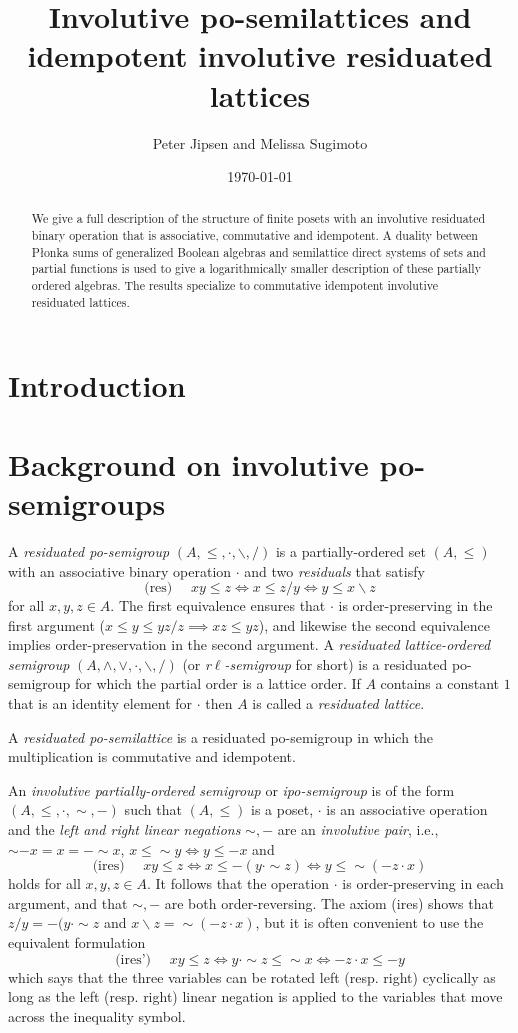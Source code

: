 \documentclass[12pt]{amsart}
\title{Involutive po-semilattices and idempotent involutive residuated lattices}
\author{Peter Jipsen and Melissa Sugimoto}
\date{\today}%
\newcommand{\rd}{{/}}
\newcommand{\ld}{{\backslash}}
\renewcommand{\ln}{{\sim}}
\newcommand{\rn}{{-}}
\begin{document}
\begin{abstract}
We give a full description of the structure of finite
posets with an involutive residuated binary operation that is associative, commutative and idempotent.
A duality between P\l onka sums of generalized Boolean algebras
and semilattice direct systems of sets and partial functions
is used to give a logarithmically smaller description of these partially
ordered algebras. The results specialize to commutative idempotent
involutive residuated lattices.
\end{abstract}

\maketitle

\section{Introduction}

\section{Background on involutive po-semigroups}
A \emph{residuated po-semigroup} $(A,\le,\cdot,\ld,\rd)$ is a partially-ordered set $(A,\le)$ with an associative binary operation $\cdot$ and two \emph{residuals} that satisfy
$$
\text{(res) }\quad xy\le z\iff x\le z\rd y\iff y\le x\ld z
$$
for all $x,y,z\in A$.
The first equivalence ensures that $\cdot$ is order-preserving in the first argument ($x\le y\le yz\rd z\implies xz\le yz$), and likewise the second equivalence implies order-preservation in the second argument. A \emph{residuated lattice-ordered semigroup} $(A,\wedge,\vee,\cdot,\ld,\rd)$ (or \emph{r$\ell$-semigroup} for short) is a residuated po-semigroup for which the partial order is
a lattice order. If $A$ contains a constant $1$ that is an identity element for $\cdot$ then $A$ is
called a \emph{residuated lattice}.

A \emph{residuated po-semilattice} is a residuated po-semigroup in which the multiplication is commutative and idempotent.

An \emph{involutive partially-ordered semigroup} or \emph{ipo-semigroup} is of the form $(A,\le,\cdot,\ln,\rn)$ such that $(A,\le)$ is a poset, $\cdot$ is an associative operation and the \emph{left and right linear negations} $\sim,-$ are an \emph{involutive pair}, i.e., $\ln\rn x=x=\rn\ln x$, $x\le \ln y\iff y\le\rn x$ and
$$
\text{(ires) }\quad xy\le z\iff x\le \rn(y\cdot\ln z)\iff y\le \ln(\rn z\cdot x)
$$
holds for all $x,y,z\in A$.
It follows that the operation $\cdot$ is order-preserving in each argument, and that $\ln,\rn$ are both order-reversing. The axiom (ires) shows that $z/y=\rn(y\cdot \ln z$ and $x\ld z=\ln(\rn z\cdot x)$, but it is often convenient to use the equivalent formulation
$$
\text{(ires') }\quad xy\le z\iff y\cdot\ln z\le \ln x\iff \rn z\cdot x\le \rn y
$$
which says that the three variables can be rotated left (resp. right) cyclically as long as the left (resp. right) linear negation is applied to the variables that move across the inequality symbol.
\end{document}
